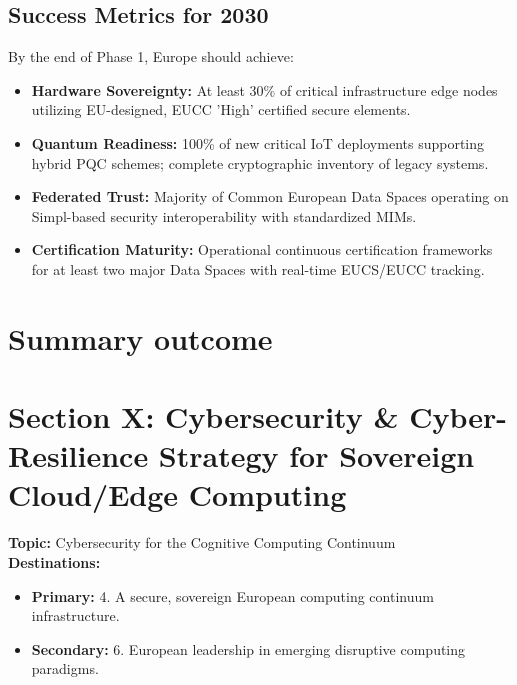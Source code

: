 \documentclass[12pt,a4paper]{article}
\begin{document}
\subsection*{Success Metrics for 2030}
By the end of Phase 1, Europe should achieve:
\begin{itemize}
    \item \textbf{Hardware Sovereignty:} At least 30\% of critical infrastructure edge nodes utilizing EU-designed, EUCC 'High' certified secure elements.
    \item \textbf{Quantum Readiness:} 100\% of new critical IoT deployments supporting hybrid PQC schemes; complete cryptographic inventory of legacy systems.
    \item \textbf{Federated Trust:} Majority of Common European Data Spaces operating on Simpl-based security interoperability with standardized MIMs.
    \item \textbf{Certification Maturity:} Operational continuous certification frameworks for at least two major Data Spaces with real-time EUCS/EUCC tracking.
\end{itemize}

\section{Summary outcome}
\section{Section X: Cybersecurity \& Cyber-Resilience Strategy for Sovereign Cloud/Edge Computing}
\noindent\textbf{Topic:} Cybersecurity for the Cognitive Computing Continuum \\
\textbf{Destinations:}
\begin{itemize}[noitemsep]
    \item \textbf{Primary:} 4. A secure, sovereign European computing continuum infrastructure.
    \item \textbf{Secondary:} 6. European leadership in emerging disruptive computing paradigms.
\end{itemize}
\end{document}

